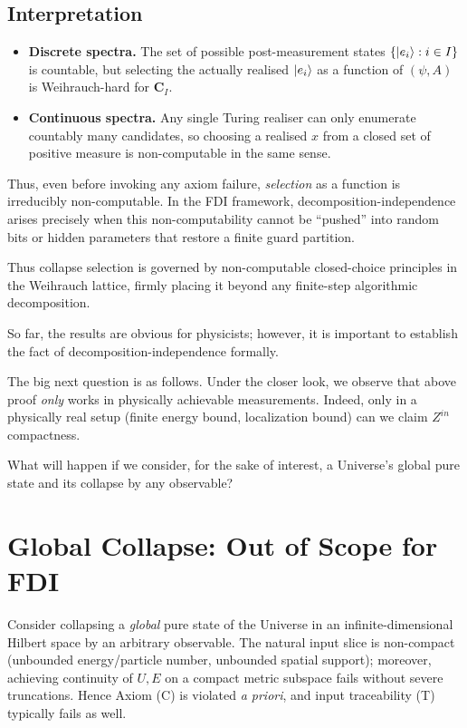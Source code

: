 \documentclass[12pt]{article}
\theoremstyle{definition}
\theoremstyle{plain}
\begin{document}
\subsection{Interpretation}
\label{subsec:choice-interpretation}

\begin{itemize}[itemsep=2pt]
  \item \textbf{Discrete spectra.} The set of possible post-measurement states $\{\ket{e_i}: i\in I\}$ is countable, but selecting the actually realised $\ket{e_i}$ as a function of $(\psi,A)$ is Weihrauch-hard for $\mathbf{C}_I$.
  \item \textbf{Continuous spectra.} Any single Turing realiser can only enumerate countably many candidates, so choosing a realised $x$ from a closed set of positive measure is non-computable in the same sense.
\end{itemize}

Thus, even before invoking any axiom failure, \emph{selection} as a function is irreducibly non-computable. In the FDI framework, decomposition-independence arises precisely when this non-computability cannot be “pushed” into random bits or hidden parameters that restore a finite guard partition.


\noindent
Thus collapse selection is governed by non-computable closed-choice
principles in the Weihrauch lattice, firmly placing it beyond any
finite-step algorithmic decomposition.

So far, the results are obvious for physicists; however, it is important to establish the fact of decomposition-independence formally.

The big next question is as follows. Under the closer look, we observe that above proof 
\emph{only} works in physically achievable measurements. Indeed, only in a physically real setup (finite energy bound, localization bound) can we claim $Z^{in}$ compactness.

What will happen if we consider, for the sake of interest, a Universe's global pure state and its collapse by any observable?


\section{Global Collapse: Out of Scope for FDI}
\label{sec:global-collapse-out-of-scope}

Consider collapsing a \emph{global} pure state of the Universe in an infinite-dimensional Hilbert space by an arbitrary observable. The natural input slice is non-compact (unbounded energy/particle number, unbounded spatial support); moreover, achieving continuity of $U,E$ on a compact metric subspace fails without severe truncations. Hence Axiom (C) is violated \emph{a priori}, and input traceability (T) typically fails as well.
\end{document}
